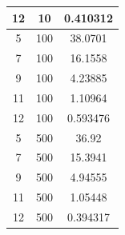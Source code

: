 \documentclass[11pt,a4paper]{report}
\begin{document}
\begin{longtable}{c|c|c}
12                                                                       & 10                          & 0.410312                                                                                   \\ \hline
5                                                                        & 100                         & 38.0701                                                                                    \\
7                                                                        & 100                         & 16.1558                                                                                    \\
9                                                                        & 100                         & 4.23885                                                                                    \\
11                                                                       & 100                         & 1.10964                                                                                    \\
12                                                                       & 100                         & 0.593476                                                                                   \\ \hline
5                                                                        & 500                         & 36.92                                                                                      \\
7                                                                        & 500                         & 15.3941                                                                                    \\
9                                                                        & 500                         & 4.94555                                                                                    \\
11                                                                       & 500                         & 1.05448                                                                                    \\
12                                                                       & 500                         & 0.394317                                                                                   \\ \hline

\end{longtable}
\end{document}
